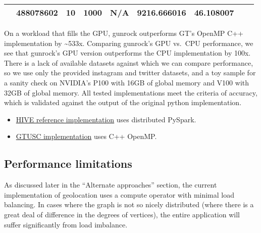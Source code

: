 \documentclass[10pt,oneside]{memoir}
\providecommand{\tightlist}{%
  \setlength{\itemsep}{0pt}\setlength{\parskip}{0pt}}
\begin{document}
\begin{longtable}[]{@{}lllllllll@{}}
\begin{minipage}[t]{0.08\columnwidth}
\end{minipage} & \begin{minipage}[t]{0.09\columnwidth}\raggedright
488078602\strut
\end{minipage} & \begin{minipage}[t]{0.06\columnwidth}\raggedright
10\strut
\end{minipage} & \begin{minipage}[t]{0.07\columnwidth}\raggedright
1000\strut
\end{minipage} & \begin{minipage}[t]{0.10\columnwidth}\raggedright
N/A\strut
\end{minipage} & \begin{minipage}[t]{0.12\columnwidth}\raggedright
9216.666016\strut
\end{minipage} & \begin{minipage}[t]{0.09\columnwidth}\raggedright
46.108007\strut
\end{minipage}\tabularnewline
\bottomrule
\end{longtable}

On a workload that fills the GPU, gunrock outperforms GT's OpenMP C++
implementation by \textasciitilde{}533x. Comparing gunrock's GPU vs.~CPU
performance, we see that gunrock's GPU version outperforms the CPU
implementation by 100x. There is a lack of available datasets against
which we can compare performance, so we use only the provided instagram
and twitter datasets, and a toy sample for a sanity check on NVIDIA's
P100 with 16GB of global memory and V100 with 32GB of global memory. All
tested implementations meet the criteria of accuracy, which is validated
against the output of the original python implementation.

\begin{itemize}
\tightlist
\item
  \href{https://gitlab.hiveprogram.com/ggillary/geotagging.git}{HIVE
  reference implementation} uses distributed PySpark.
\item
  \href{https://gitlab.hiveprogram.com/gtusc/geotagging}{GTUSC
  implementation} uses C++ OpenMP.
\end{itemize}

\hypertarget{performance-limitations-1}{%
\subsection{Performance limitations}\label{performance-limitations-1}}

As discussed later in the ``Alternate approaches'' section, the current
implementation of geolocation uses a compute operator with minimal load
balancing. In cases where the graph is not so nicely distributed (where
there is a great deal of difference in the degrees of vertices), the
entire application will suffer significantly from load imbalance.
\end{document}
